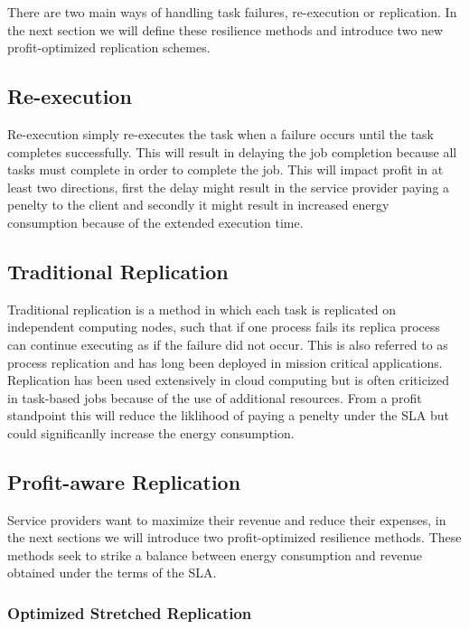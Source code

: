 There are two main ways of handling task failures, re-execution or
replication. In the next section we will define these resilience
methods and introduce two new profit-optimized replication schemes.

\subsection{Re-execution}

Re-execution simply re-executes the task when a failure occurs until
the task completes successfully. This will result in delaying the job
completion because all tasks must complete in order to complete the
job. This will impact profit in at least two directions, first the
delay might result in the service provider paying a penelty to the
client and secondly it might result in increased energy consumption
because of the extended execution time.

\subsection{Traditional Replication}

Traditional replication is a method in which each task is replicated
on independent computing nodes, such that if one process fails its
replica process can continue executing as if the failure did not
occur. This is also referred to as process replication and has long
been deployed in mission critical applications. Replication has been
used extensively in cloud computing
\cite{tsai_isads_2011,ko_socc_2010} but is often criticized in
task-based jobs because of the use of additional resources. From a
profit standpoint this will reduce the liklihood of paying a penelty
under the SLA but could significanlly increase the energy consumption.

\subsection{Profit-aware Replication}

Service providers want to maximize their revenue and reduce their
expenses, in the next sections we will introduce two profit-optimized
resilience methods. These methods seek to strike a balance between
energy consumption and revenue obtained under the terms of the SLA.

\subsubsection{Optimized Stretched Replication}

